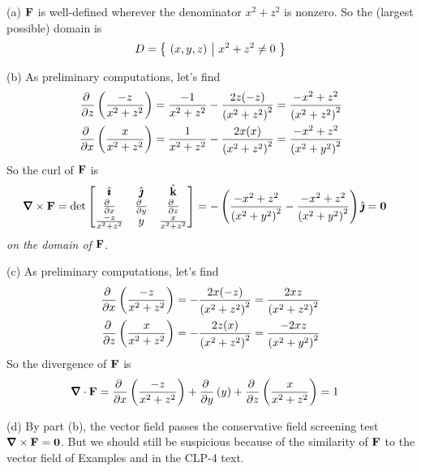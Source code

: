 \begin{solution}(a) $\mathbf{F}$ is well-defined wherever the denominator
$x^2+z^2$ is nonzero. So the (largest possible) domain is
\begin{align*}
D=\big\{ \ (x,y,z)\ \big|\ x^2+z^2\ne 0\ \big\}
\end{align*}

\noindent (b) 
As preliminary computations, let's find
\begin{align*}
\pdiff{}{z}\left(\frac{-z}{x^2+z^2}\right)
&=\frac{-1}{x^2+z^2}-\frac{2z(-z)}{{(x^2+z^2)}^2}
=\frac{-x^2+z^2}{{(x^2+z^2)}^2}
\\
\pdiff{}{x}\left(\frac{x}{x^2+z^2}\right)
&=\frac{1}{x^2+z^2}-\frac{2x(x)}{{(x^2+z^2)}^2}
=\frac{-x^2+z^2}{{(x^2+y^2)}^2}
\end{align*}
So the curl of $\mathbf{F}$ is
\begin{align*}
\vnabla\times\vF
&=\det\left[\begin{matrix}
\hi &\hj &\hk \\
\tfrac{\partial\hfill}{\partial x} & \tfrac{\partial\hfill}{\partial y} & 
                \tfrac{\partial\hfill}{\partial z} \\
\frac{-z}{x^2+z^2} & y & \frac{x}{x^2+z^2}
\end{matrix}
\right]
=-\left(\frac{-x^2+z^2}{{(x^2+y^2)}^2}
  -\frac{-x^2+z^2}{{(x^2+y^2)}^2}\right)\hj
=\vZero
\end{align*}
\emph{on the domain of $\mathbf{F}$}.

\noindent (c)
As preliminary computations, let's find
\begin{align*}
\pdiff{}{x}\left(\frac{-z}{x^2+z^2}\right)
&=-\frac{2x(-z)}{{(x^2+z^2)}^2}
=\frac{2xz}{{(x^2+z^2)}^2}
\\
\pdiff{}{z}\left(\frac{x}{x^2+z^2}\right)
&=-\frac{2z(x)}{{(x^2+z^2)}^2}
=\frac{-2xz}{{(x^2+y^2)}^2}
\end{align*}
So the divergence of $\mathbf{F}$ is
\begin{align*}
\vnabla\cdot\vF
&=\pdiff{}{x}\left(\frac{-z}{x^2+z^2}\right)
  +\pdiff{}{y}\left(y\right)
  + \pdiff{}{z}\left(\frac{x}{x^2+z^2}\right)
=1
\end{align*}

\noindent (d) 
By part (b), the vector field passes the conservative field screening test
$\vnabla\times\vF=\vZero$. But we should still be suspicious because
of the similarity of $\mathbf{F}$ to the vector field of 
Examples  and 
in the CLP-4 text.


\end{solution}
